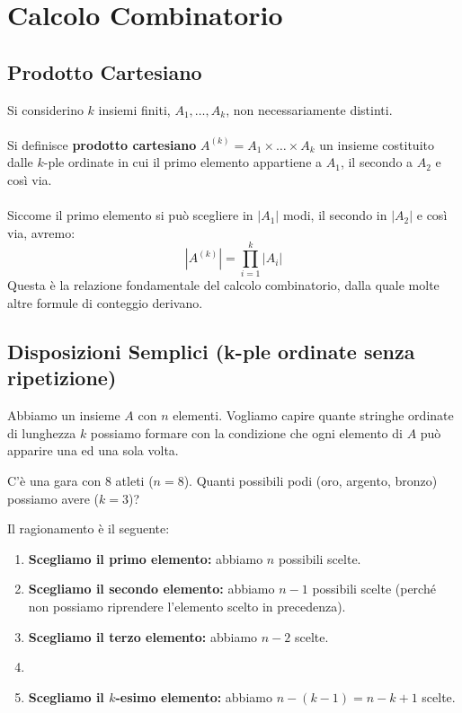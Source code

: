 \section{Calcolo Combinatorio}
\subsection{Prodotto Cartesiano}

Si considerino $k$ insiemi finiti, $A_1, \dots, A_k$, non necessariamente distinti.
\\\\Si definisce \textbf{prodotto cartesiano} $A^{(k)} = A_1 \times \dots \times A_k$ un insieme costituito dalle $k$-ple ordinate in cui il primo elemento appartiene a $A_1$, il secondo a $A_2$ e così via.
\\\\Siccome il primo elemento si può scegliere in $|A_1|$ modi, il secondo in $|A_2|$ e così via, avremo:
    \[
    |A^{(k)}| = \prod_{i=1}^{k} |A_i|
    \]
Questa è la relazione fondamentale del calcolo combinatorio, dalla quale molte altre formule di conteggio derivano.

\subsection{Disposizioni Semplici (k-ple ordinate senza ripetizione)}

Abbiamo un insieme $A$ con $n$ elementi. Vogliamo capire quante stringhe ordinate di lunghezza $k$ possiamo formare con la condizione che ogni elemento di $A$ può apparire una ed una sola volta.

\begin{esempio}
	C'è una gara con 8 atleti ($n=8$). Quanti possibili podi (oro, argento, bronzo) possiamo avere ($k=3$)?
\end{esempio}

Il ragionamento è il seguente:
\begin{enumerate}
	\item \textbf{Scegliamo il primo elemento:} abbiamo $n$ possibili scelte.
	\item \textbf{Scegliamo il secondo elemento:} abbiamo $n-1$ possibili scelte (perché non possiamo riprendere l'elemento scelto in precedenza).
	\item \textbf{Scegliamo il terzo elemento:} abbiamo $n-2$ scelte.
	\item[\dots]
	\item \textbf{Scegliamo il $k$-esimo elemento:} abbiamo $n - (k-1) = n - k + 1$ scelte.
\end{enumerate}


